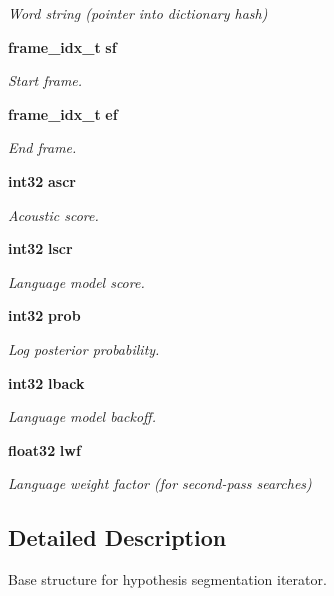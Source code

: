 \begin{DoxyCompactItemize}
\begin{DoxyCompactList}\small\item\em \-Word string (pointer into dictionary hash) \end{DoxyCompactList}\item 
{\bf frame\-\_\-idx\-\_\-t} {\bf sf}
\begin{DoxyCompactList}\small\item\em \-Start frame. \end{DoxyCompactList}\item 
{\bf frame\-\_\-idx\-\_\-t} {\bf ef}
\begin{DoxyCompactList}\small\item\em \-End frame. \end{DoxyCompactList}\item 
{\bf int32} {\bf ascr}
\begin{DoxyCompactList}\small\item\em \-Acoustic score. \end{DoxyCompactList}\item 
{\bf int32} {\bf lscr}
\begin{DoxyCompactList}\small\item\em \-Language model score. \end{DoxyCompactList}\item 
{\bf int32} {\bf prob}
\begin{DoxyCompactList}\small\item\em \-Log posterior probability. \end{DoxyCompactList}\item 
{\bf int32} {\bf lback}
\begin{DoxyCompactList}\small\item\em \-Language model backoff. \end{DoxyCompactList}\item 
{\bf float32} {\bf lwf}\label{structps__seg__s_a2249c012b83c902f4f8ed8d98ded7d20}

\begin{DoxyCompactList}\small\item\em \-Language weight factor (for second-\/pass searches) \end{DoxyCompactList}\end{DoxyCompactItemize}


\subsection{\-Detailed \-Description}
\-Base structure for hypothesis segmentation iterator. 

